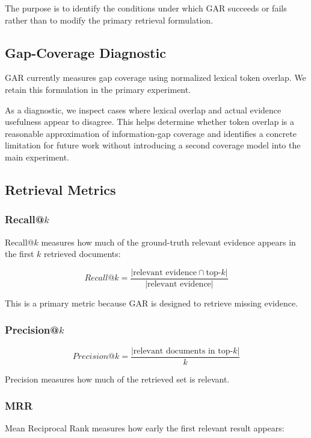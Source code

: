 \documentclass[11pt,a4paper]{article}
\begin{document}
The purpose is to identify the conditions under which GAR succeeds or fails rather than to modify the primary retrieval formulation.

\subsection{Gap-Coverage Diagnostic}

GAR currently measures gap coverage using normalized lexical token overlap. We retain this formulation in the primary experiment.

As a diagnostic, we inspect cases where lexical overlap and actual evidence usefulness appear to disagree. This helps determine whether token overlap is a reasonable approximation of information-gap coverage and identifies a concrete limitation for future work without introducing a second coverage model into the main experiment.

\subsection{Retrieval Metrics}

\subsubsection{Recall@$k$}

Recall@$k$ measures how much of the ground-truth relevant evidence appears in the first $k$ retrieved documents:

\[
\boxed{
Recall@k
=
\frac{
|\text{relevant evidence}\cap\text{top-}k|
}{
|\text{relevant evidence}|
}
}
\]

This is a primary metric because GAR is designed to retrieve missing evidence.

\subsubsection{Precision@$k$}

\[
\boxed{
Precision@k
=
\frac{
|\text{relevant documents in top-}k|
}{
k
}
}
\]

Precision measures how much of the retrieved set is relevant.

\subsubsection{MRR}

Mean Reciprocal Rank measures how early the first relevant result appears:
\end{document}
